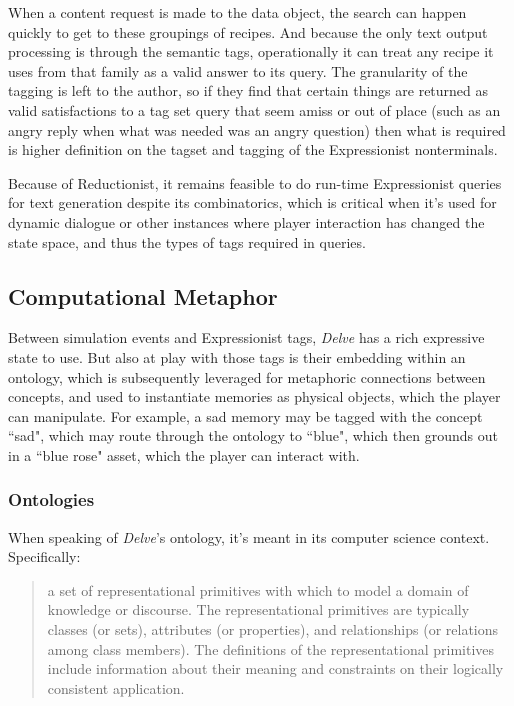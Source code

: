 When a content request is made to the data object, the search can happen quickly to get to these groupings of recipes. And because the only text output processing is through the semantic tags, operationally it can treat any recipe it uses from that family as a valid answer to its query. The granularity of the tagging is left to the author, so if they find that certain things are returned as valid satisfactions to a tag set query that seem amiss or out of place (such as an angry reply when what was needed was an angry question) then what is required is higher definition on the tagset and tagging of the Expressionist nonterminals.

Because of Reductionist, it remains feasible to do run-time Expressionist queries for text generation despite its combinatorics, which is critical when it's used for dynamic dialogue or other instances where player interaction has changed the state space, and thus the types of tags required in queries.

\subsection{Computational Metaphor}\label{subsec:computational-metaphor}

Between simulation events and Expressionist tags, \textit{Delve} has a rich expressive state to use. But also at play with those tags is their embedding within an ontology, which is subsequently leveraged for metaphoric connections between concepts, and used to instantiate memories as physical objects, which the player can manipulate. For example, a sad memory may be tagged with the concept ``sad", which may route through the ontology to ``blue", which then grounds out in a ``blue rose" asset, which the player can interact with.

\subsubsection{Ontologies}\label{subsubsec:delve-ontologies}

When speaking of \textit{Delve}'s ontology, it's meant in its computer science context. Specifically:

\begin{quote}
    a set of representational primitives with which to model a domain of knowledge or discourse. The representational primitives are typically classes (or sets), attributes (or properties), and relationships (or relations among class members). The definitions of the representational primitives include information about their meaning and constraints on their logically consistent application. \cite{liu2009encyclopedia}
\end{quote}

